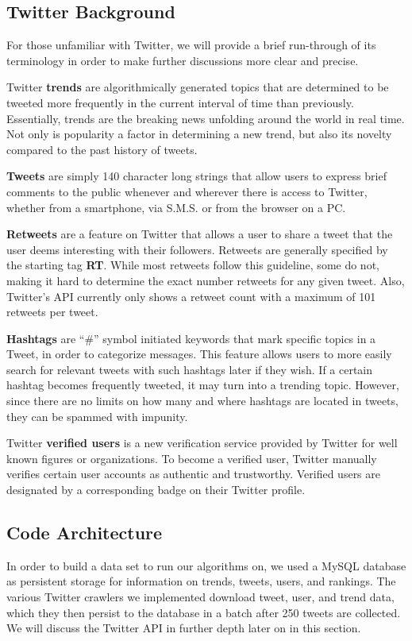 \documentclass[10pt]{proc}
\begin{document}
  \subsection{Twitter Background}
  For those unfamiliar with Twitter, we will provide a brief run-through of its terminology in order to make further discussions more clear and precise.

  Twitter \textbf{trends} are algorithmically generated topics that are determined to be tweeted more frequently in the current interval of time than previously.  Essentially, trends are the breaking news unfolding around the world in real time.  Not only is popularity a factor in determining a new trend, but also its novelty compared to the past history of tweets.

  \textbf{Tweets} are simply 140 character long strings that allow users to express brief comments to the public whenever and wherever there is access to Twitter, whether from a smartphone, via S.M.S. or from the browser on a PC.

  \textbf{Retweets} are a feature on Twitter that allows a user to share a tweet that the user deems interesting with their followers. Retweets are generally specified by the starting tag \textbf{RT}. While most retweets follow this guideline, some do not, making it hard to determine the exact number retweets for any given tweet. Also, Twitter's API currently only shows a retweet count with a maximum of 101 retweets per tweet.

  \textbf{Hashtags} are ``\#'' symbol initiated keywords that mark specific topics in a Tweet, in order to categorize messages.  This feature allows users to more easily search for relevant tweets with such hashtags later if they wish.  If a certain hashtag becomes frequently tweeted, it may turn into a trending topic.  However, since there are no limits on how many and where hashtags are located in tweets, they can be spammed with impunity.

  Twitter \textbf{verified users} is a new verification service provided by Twitter for well known figures or organizations. To become a verified user, Twitter manually verifies certain user accounts as authentic and trustworthy. Verified users are designated by a corresponding badge on their Twitter profile.

  \subsection{Code Architecture}
  In order to build a data set to run our algorithms on, we used a MySQL database as persistent storage for information on trends, tweets, users, and rankings.  The various Twitter crawlers we implemented download tweet, user, and trend data, which they then persist to the database in a batch after 250 tweets are collected. We will discuss the Twitter API in further depth later on in this section.
\end{document}
